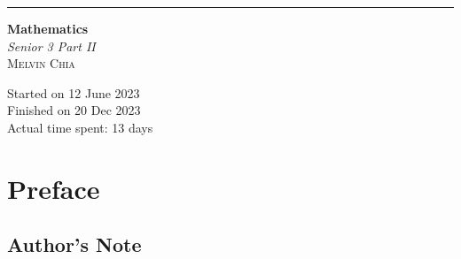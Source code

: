 \documentclass{report}
\begin{document}
\newcommand{\sol}[1]{

    \noindent \textbf{\textit{Solution}}
}
\newcommand{\prooff}[1]{

    \noindent\textbf{\textit{Proof}}
}

\newcommand{\sxrightarrow}[2][]{%
    \mathrel{\text{$\xrightarrow[#1]{#2}$}}%
}

\newenvironment{cequation}{
    \makeatletter
    \setbool{@fleqn}{false}
    \makeatother
    \begin{equation*}
        }{\end{equation*}}

\begin{titlepage}
    \raggedleft{}
    \rule{1pt}{\textheight}
    \hspace{0.02\textwidth}
    \parbox[b]{0.75\textwidth}{

    {\fontsize{40}{60}\selectfont\bfseries Mathematics}\\[2\baselineskip]
    {\huge\textit{Senior 3 Part II}}\\[4\baselineskip]
    {\Large\textsc{Melvin Chia}}

    \vspace{0.5\textheight}

    {\noindent Started on 12 June 2023}\\[\baselineskip]
    {\noindent Finished on 20 Dec 2023}\\[\baselineskip]
    {\noindent Actual time spent: 13 days}\\[\baselineskip]}

\end{titlepage}

\onehalfspacing{}

\vspace{-10cm}
\titleformat{\chapter}[display]
{\normalfont\huge\bfseries}{\chaptertitlename\ \thechapter}{20pt}{\Huge}
\titlespacing*{\chapter}{0pt}{-20pt}{40pt}
\chapter*{Preface}
\section*{Author's Note}
\end{document}
